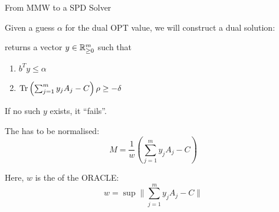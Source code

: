 \begin{frame}{From MMW to a SPD Solver}

Given a guess $\alpha$ for the dual OPT value, we will construct a dual solution:

\vspace{\floatsep}

\structure{$\oracle_\delta(\rho)$} returns a vector $y\in\mathbb{R}^m_{\geq 0}$ such that
\begin{enumerate}
 \item $b^Ty \leq \alpha$
 \item$\operatorname{Tr}\left(\sum_{j=1}^m y_j A_j - C \right)\rho  \geq -\delta$
\end{enumerate}
If no such $y$ exists, it ``fails''.

\vspace{\floatsep}

The  has to be normalised:
\begin{equation*}
 M = \frac{1}{w} \left( \sum_{j=1}^m y_j A_j - C \right)
\end{equation*}



Here, $w$ is the  of the ORACLE:
\begin{equation*}
 w = \sup \bigg\| \sum_{j=1}^m y_j A_j - C  \bigg\|
\end{equation*}


\end{frame}

